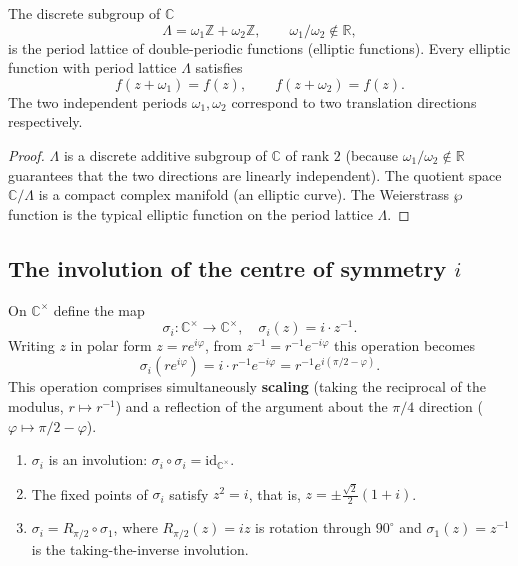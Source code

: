 \begin{theorem}\label{thm:complex_double_period}
The discrete subgroup of $\mathbb{C}$
\[
\Lambda = \omega_1 \mathbb{Z} + \omega_2 \mathbb{Z},\qquad \omega_1/\omega_2 \notin \mathbb{R},
\]
is the period lattice of double-periodic functions (elliptic functions). Every elliptic function with period lattice $\Lambda$ satisfies
\[
f(z + \omega_1) = f(z), \qquad f(z + \omega_2) = f(z).
\]
The two independent periods $\omega_1, \omega_2$ correspond to two translation directions respectively.
\end{theorem}

\begin{proof}
$\Lambda$ is a discrete additive subgroup of $\mathbb{C}$ of rank $2$ (because $\omega_1/\omega_2 \notin \mathbb{R}$ guarantees that the two directions are linearly independent). The quotient space $\mathbb{C}/\Lambda$ is a compact complex manifold (an elliptic curve). The Weierstrass $\wp$ function is the typical elliptic function on the period lattice $\Lambda$.
\end{proof}

\subsection{\texorpdfstring{The involution of the centre of symmetry $i$}{The involution of the centre of symmetry i}}

\begin{definition}\label{def:complex_i_involution}
On $\mathbb{C}^{\times}$ define the map
\[
\sigma_i: \mathbb{C}^{\times} \to \mathbb{C}^{\times}, \quad \sigma_i(z) = i \cdot z^{-1}.
\]
Writing $z$ in polar form $z = re^{i\varphi}$, from $z^{-1} = r^{-1}e^{-i\varphi}$ this operation becomes
\[
\sigma_i(re^{i\varphi}) = i \cdot r^{-1} e^{-i\varphi} = r^{-1} e^{i(\pi/2 - \varphi)}.
\]
This operation comprises simultaneously \textbf{scaling} (taking the reciprocal of the modulus, $r \mapsto r^{-1}$) and a reflection of the argument about the $\pi/4$ direction ($\varphi \mapsto \pi/2 - \varphi$).
\end{definition}

\begin{proposition}\label{prop:complex_i_involution_properties}
\begin{enumerate}[label=(\roman*)]
    \item $\sigma_i$ is an involution: $\sigma_i \circ \sigma_i = \text{id}_{\mathbb{C}^{\times}}$.
    \item The fixed points of $\sigma_i$ satisfy $z^2 = i$, that is, $z = \pm \frac{\sqrt{2}}{2}(1+i)$.
    \item $\sigma_i = R_{\pi/2} \circ \sigma_1$, where $R_{\pi/2}(z) = iz$ is rotation through $90^\circ$ and $\sigma_1(z) = z^{-1}$ is the taking-the-inverse involution.
\end{enumerate}
\end{proposition}

